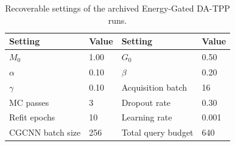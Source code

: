 \begin{table}[!htbp]
\centering
\caption{Recoverable settings of the archived Energy-Gated DA-TPP runs.}
\label{tab:archived-settings}
\small
\begin{tabular}{llll}
\toprule
Setting & Value & Setting & Value \\
\midrule
$M_0$ & 1.00 & $G_0$ & 0.50 \\
$\alpha$ & 0.10 & $\beta$ & 0.20 \\
$\gamma$ & 0.10 & Acquisition batch & 16 \\
MC passes & 3 & Dropout rate & 0.30 \\
Refit epochs & 10 & Learning rate & 0.001 \\
CGCNN batch size & 256 & Total query budget & 640 \\
\bottomrule
\end{tabular}
\end{table}
